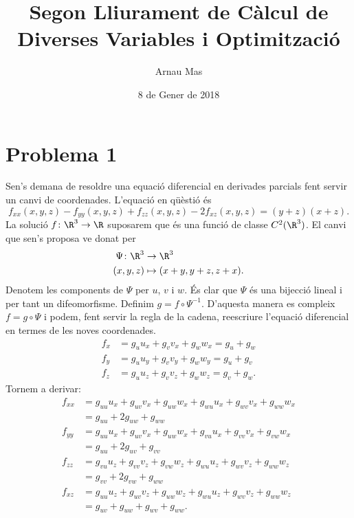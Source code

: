 \documentclass[12pt, a4paper]{article}
\title{Segon Lliurament de Càlcul de Diverses Variables i Optimització}
\author{Arnau Mas}
\date{8 de Gener de 2018}
\begin{document}
\maketitle

\section{Problema 1} \label{sec:problema 1}
Sen's demana de resoldre una equació diferencial en derivades parcials fent servir un canvi de coordenades. L'equació en qüèstió és 
\begin{equation}
  f_{xx}(x,y,z) - f_{yy}(x,y,z) + f_{zz}(x,y,z) - 2f_{xz}(x,y,z) = (y + z)(x + z) \label{eq:eq diferencial}.
\end{equation}
La solució \( f \colon \R^3 \to \R \) suposarem que és una funció de classe \( C^2(\R^3) \). El canvi que sen's proposa ve donat per
\begin{equation}
	\begin{aligned}
	\Psi \colon \R^3 & \to \R^3 \\  
			 (x,y,z) & \mapsto (x+y, y+z, z+x) .
	\end{aligned} 
	\label{eq:canvi de variables}
\end{equation}
Denotem les components de \( \Psi \) per \( u \), \( v \) i \( w \). És clar que \( \Psi \) és una bijecció lineal i per tant un difeomorfisme. Definim \( g = f \circ \Psi^{-1} \). D'aquesta manera es compleix \( f = g \circ \Psi \) i podem, fent servir la regla de la cadena, reescriure l'equació diferencial en termes de les noves coordenades. 
\begin{equation}
	\begin{aligned}
  f_x &= g_u u_x + g_v v_x + g_w w_x = g_u + g_w \\
  f_y &= g_u u_y + g_v v_y + g_w w_y = g_u + g_v \\
  f_z &= g_u u_z + g_v v_z + g_w w_z = g_v + g_w. 
	\end{aligned}
	\label{eq:primeres derivades}
\end{equation}
Tornem a derivar:
\begin{align*}
	f_{xx} &= g_{uu}u_x + g_{uv}v_x + g_{uw}w_x + g_{wu}u_x + g_{wv}v_x + g_{ww}w_x  \\
				 &= g_{uu} + 2g_{uw} + g_{ww} \\
	f_{yy} &= g_{uu}u_x + g_{uv}v_x + g_{uw}w_x + g_{vu}u_x + g_{vv}v_x + g_{vw}w_x  \\
				 &= g_{uu} + 2g_{uv} + g_{vv} \\
	f_{zz} &= g_{vu}u_z + g_{vv}v_z + g_{vw}w_z + g_{wu}u_z + g_{wv}v_z + g_{ww}w_z  \\
				 &= g_{vv} + 2g_{vw} + g_{ww} \\
	f_{xz} &= g_{uu}u_z + g_{uv}v_z + g_{uw}w_z + g_{wu}u_z + g_{wv}v_z + g_{ww}w_z  \\
				 &= g_{uv} + g_{uw} + g_{wv} + g_{ww}. \\
\end{align*}
\end{document}
